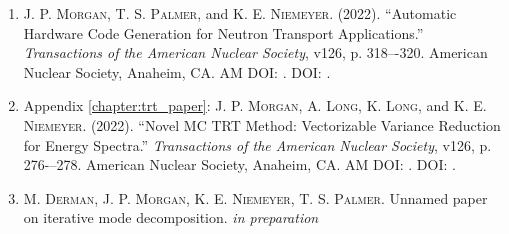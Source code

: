 \begin{enumerate}
    \item \textsc{J. P. Morgan}, \textsc{T. S. Palmer}, and \textsc{K. E. Niemeyer}. (2022). “Automatic Hardware Code Generation for Neutron Transport Applications.” \emph{Transactions of the American Nuclear Society}, v126, p. 318–-320. American Nuclear Society, Anaheim, CA. AM DOI: . DOI: .

    \item Appendix \ref{chapter:trt_paper}: \textsc{J. P. Morgan}, \textsc{A. Long}, \textsc{K. Long}, and \textsc{K. E. Niemeyer}. (2022). “Novel MC TRT Method: Vectorizable Variance Reduction for Energy Spectra.” \emph{Transactions of the American Nuclear Society}, v126, p. 276-–278. American Nuclear Society, Anaheim, CA. AM DOI: . DOI: .

    \item \textsc{M. Derman}, \textsc{J. P. Morgan}, \textsc{K. E. Niemeyer}, \textsc{T. S. Palmer}. Unnamed paper on iterative mode decomposition. \emph{in preparation}
\end{enumerate}